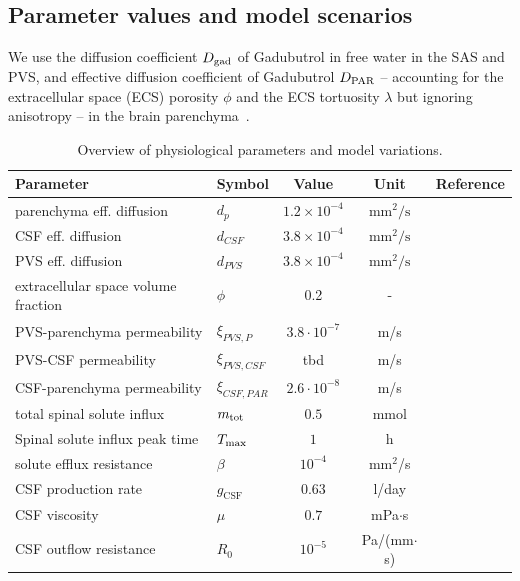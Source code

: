 \documentclass[fleqn,10pt]{wlscirep}
\begin{document}
\subsection*{Parameter values and model scenarios}
We use the diffusion coefficient $D_{\rm gad}$ of Gadubutrol in free water in the SAS and PVS, and effective diffusion coefficient of Gadubutrol $D_{\rm PAR}$ -- accounting for the extracellular space (ECS) porosity $\phi$ and the ECS tortuosity $\lambda$ but ignoring anisotropy  -- in the brain parenchyma~\cite{hornkjol2022csf}. 
\begin{table}
  \begin{center}
    \begin{tabular}{ll|ccc}
      \toprule
      Parameter& Symbol & Value & Unit& Reference\\
      \midrule
         parenchyma eff. diffusion&  $d_p$&  $1.2 \times 10^{-4}$& $\text{mm}^2/\text{s}$  & \cite{valnes2020apparent}\\
         CSF eff. diffusion&  $d_{CSF}$&  $3.8 \times 10^{-4}$& $\text{mm}^2/\text{s}$ & \cite{valnes2020apparent}\\
         PVS eff. diffusion&  $d_{PVS}$&  $3.8 \times 10^{-4}$& $\text{mm}^2/\text{s}$ & \cite{valnes2020apparent}\\
         extracellular space volume fraction& $\phi$& 0.2& - &\cite{nicholson1981ion} \\
         PVS-parenchyma permeability&  $\xi_{PVS,P}$ & $3.8\cdot 10^{-7}$  & m/s & \cite{koch2023estimates} \\
         PVS-CSF permeability&  $\xi_{PVS,CSF}$& tbd & m/s & \\
         CSF-parenchyma permeability&  $\xi_{CSF,PAR}$& $2.6 \cdot 10^{-8}$ & m/s & \cite{riseth2025twocompartment} \\
         \midrule
         total spinal solute influx & $m_{\rm tot}$  & $0.5$ & mmol  & \cite{eide2024functional} \\
         Spinal solute influx peak time & $T_{\rm max}$ & $1$  & h & \\
         solute efflux resistance & $\beta$  & $10^{-4}$ & mm$^2$/s & \cite{hornkjol2022csf} \\
         \midrule
         CSF production rate & $g_{\mathrm{CSF}}$ & $0.63$  & l/day & \cite{nilsson1992circadian} \\
         CSF viscosity & $\mu$ & $0.7$  & mPa$ \cdot $s & \cite{bloomfield1998effects} \\ 
        CSF outflow resistance & $R_0$ & $10^{-5}$  & Pa/(mm$\cdot$s) & \cite{hornkjol2022csf} \\ 
        \bottomrule
    \end{tabular}
  \end{center}
  \caption{Overview of physiological parameters and model variations. 
  }
  \label{tab:overview}
\end{table}
\end{document}
